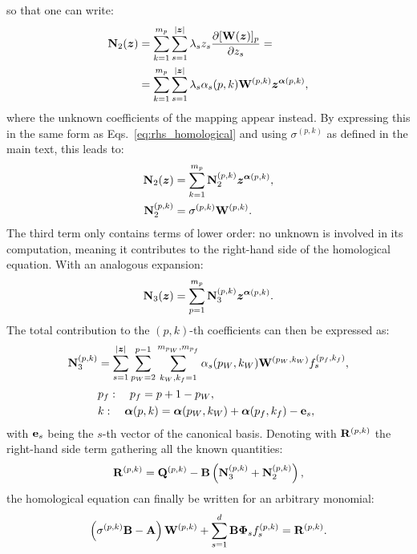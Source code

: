 \documentclass[%
reprint,
superscriptaddress,
 amsmath,amssymb,
 aps,
 pre
]{revtex4-2}
\begin{document}
so that one can write:
\begin{align}
    \mathbf{N}_2({\boldsymbol{z}}) &= \sum_{k=1}^{m_p} \sum_{s=1}^{|{\boldsymbol{z}}|} \lambda_s z_s \frac{\partial [\mathbf{W}({\boldsymbol{z}})]_p}{\partial z_s} =\nonumber\\
    &= \sum_{k=1}^{m_p} \sum_{s=1}^{|{\boldsymbol{z}}|} \lambda_s \alpha_s(p,k) \mathbf{W}^{(p,k)} {\boldsymbol{z}}^{\boldsymbol{\alpha}(p,k)},
\end{align}
where the unknown coefficients of the mapping appear instead. By expressing this in the same form as Eqs.~\eqref{eq:rhs_homological} and using $\sigma^{(p,k)}$ as defined in the main text, this leads to:
\begin{align}
    \mathbf{N}_2({\boldsymbol{z}}) &= \sum_{k=1}^{m_p} \mathbf{N}_2^{(p,k)} {\boldsymbol{z}}^{\boldsymbol{\alpha}(p,k)},\\
    \mathbf{N}_2^{(p,k)} &= \sigma^{(p,k)} \mathbf{W}^{(p,k)}.
\end{align}
The third term only contains terms of lower order: no unknown is involved in its computation, meaning it contributes to the right-hand side of the homological equation. With an analogous expansion:
\begin{equation}
    \mathbf{N}_3({\boldsymbol{z}}) = \sum_{p=1}^{m_p} \mathbf{N}_3^{(p,k)} {\boldsymbol{z}}^{\boldsymbol{\alpha}(p,k)}.
\end{equation}
The total contribution to the $(p,k)$-th coefficients can then be expressed as:
\begin{align}
    \mathbf{N}_3^{(p,k)} & = 
    \sum_{s=1}^{|{\boldsymbol{z}}|} 
    \sum_{p_W=2}^{p-1}
    \sum_{k_W,k_f=1}^{m_{p_W},m_{p_f}} 
    \alpha_s (p_W,k_W) \mathbf{W}^{(p_W,k_W)} f_s^{(p_f,k_f)},
    \\     
    & p_f: \quad p_f=p+1-p_W ,
    \nonumber 
    \\
    & k: \quad \boldsymbol{\alpha}(p,k)=\boldsymbol{\alpha} (p_W,k_W) + \boldsymbol{\alpha} (p_f,k_f) - \mathbf{e}_s,
    \nonumber
\end{align}
with $\mathbf{e}_s$ being the $s$-th vector of the canonical basis.
Denoting with $\mathbf{R}^{(p,k)}$ the right-hand side term gathering all the known quantities:
\begin{equation}
    \mathbf{R}^{(p,k)} = \mathbf{Q}^{(p,k)} - \mathbf{B} \left(\mathbf{N}_3^{(p,k)} + \mathbf{N}_2^{(p,k)} \right),   
\end{equation}
the homological equation can finally be written for an arbitrary monomial:
\begin{equation}
\label{eq:homological_discrete}
    \left( \sigma^{(p,k)} \mathbf{B} - \mathbf{A} \right) \mathbf{W}^{(p,k)} + \sum_{s=1}^d \mathbf{B} \boldsymbol{\Phi}_s f_s^{(p,k)} = \mathbf{R}^{(p,k)}.
\end{equation}
\end{document}
